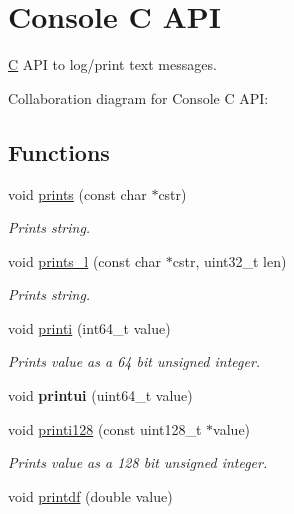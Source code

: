\hypertarget{group__consolecapi}{}\section{Console C A\+PI}
\label{group__consolecapi}


\mbox{\hyperlink{struct_c}{C}} A\+PI to log/print text messages.  


Collaboration diagram for Console C A\+PI\+:
\subsection*{Functions}
\begin{DoxyCompactItemize}
\item 
void \mbox{\hyperlink{group__consolecapi_gaa99be0cc1b9e5cbbc2b12a43537e7ed3}{prints}} (const char $\ast$cstr)
\begin{DoxyCompactList}\small\item\em Prints string. \end{DoxyCompactList}\item 
void \mbox{\hyperlink{group__consolecapi_ga63ff8a7c0b046968ab2864df7284c910}{prints\+\_\+l}} (const char $\ast$cstr, uint32\+\_\+t len)
\begin{DoxyCompactList}\small\item\em Prints string. \end{DoxyCompactList}\item 
void \mbox{\hyperlink{group__consolecapi_gaac924af668edbf421d478edf203fdbd1}{printi}} (int64\+\_\+t value)
\begin{DoxyCompactList}\small\item\em Prints value as a 64 bit unsigned integer. \end{DoxyCompactList}\item 
\mbox{\label{group__consolecapi_gaaf5e50a1ade4fa863b171b6d5d35a124}} 
void {\bfseries printui} (uint64\+\_\+t value)
\item 
void \mbox{\hyperlink{group__consolecapi_ga0ac41ae1c31cf87a4adc14d9edb3e6a5}{printi128}} (const uint128\+\_\+t $\ast$value)
\begin{DoxyCompactList}\small\item\em Prints value as a 128 bit unsigned integer. \end{DoxyCompactList}\item 
void \mbox{\hyperlink{group__consolecapi_gaea777842a3946bf2936e0d2d0ba95df2}{printdf}} (double value)

\end{DoxyCompactItemize}
